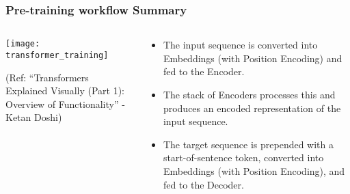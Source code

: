 \begin{frame}[fragile]\frametitle{Pre-training workflow Summary}

\begin{columns}
     \begin{column}[T]{0.5\linewidth}
\begin{center}
\texttt{[image: transformer\_training]}


{\tiny (Ref: ``Transformers Explained Visually (Part 1): Overview of Functionality'' - Ketan Doshi)}
\end{center}		

		\end{column}
    \begin{column}[T]{0.5\linewidth}

\begin{itemize}
\item The input sequence is converted into Embeddings (with Position Encoding) and fed to the Encoder.
\item The stack of Encoders processes this and produces an encoded representation of the input sequence.
\item The target sequence is prepended with a start-of-sentence token, converted into Embeddings (with Position Encoding), and fed to the Decoder.
\end{itemize}
    \end{column}
  \end{columns}	

\end{frame}


